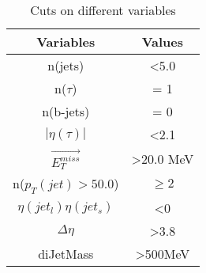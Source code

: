 
\begin{table}[h]
\centering
\caption{Cuts on different variables}
\label{Cuts_variables}
\begin{tabular}{|c|c|}
\hline
Variables                & Values                \\ \hline
n(jets)                  & \textless 5.0         \\ \hline
n($\tau$)                & = 1                   \\ \hline
n(b-jets)                & = 0                   \\ \hline
$|\eta(\tau)|$           & \textless 2.1         \\ \hline
$\vec{E_T^{miss}}$       & \textgreater 20.0 MeV \\ \hline
n($p_T(jet) > 50.0$)     & $\geq 2$              \\ \hline
$\eta(jet_l)\eta(jet_s)$ & \textless0            \\ \hline
$\Delta \eta$            & \textgreater3.8       \\ \hline
diJetMass                & \textgreater500MeV    \\ \hline
\end{tabular}
\end{table}


